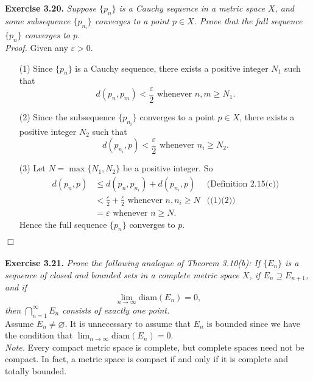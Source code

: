 \documentclass{article}
\begin{document}
\textbf{Exercise 3.20.}
\emph{Suppose $\{p_n\}$ is a Cauchy sequence in a metric space $X$,
and some subsequence $\{p_{n_i}\}$ converges to a point $p \in X$.
Prove that the full sequence $\{p_n\}$ converges to $p$. } \\

\emph{Proof.}
Given any $\varepsilon > 0$.
\begin{enumerate}
\item[(1)]
Since $\{p_n\}$ is a Cauchy sequence, there exists a positive integer $N_1$ such that
$$d(p_n,p_m) < \frac{\varepsilon}{2} \text{ whenever } n, m \geq N_1.$$
\item[(2)]
Since the subsequence $\{p_{n_i}\}$ converges to a point $p \in X$,
there exists a positive integer $N_2$ such that
$$d(p_{n_i},p) < \frac{\varepsilon}{2} \text{ whenever } n_i \geq N_2.$$
\item[(3)]
Let $N = \max\{N_1, N_2\}$ be a positive integer.
So
\begin{align*}
d(p_n,p)
&\leq d(p_n,p_{n_i}) + d(p_{n_i}, p)
  &\text{(Definition 2.15(c))} \\
&< \frac{\varepsilon}{2} + \frac{\varepsilon}{2} \text{ whenever } n, n_i \geq N
  &\text{((1)(2))} \\
&= \varepsilon \text{ whenever } n \geq N.
\end{align*}
Hence the full sequence $\{p_n\}$ converges to $p$.
\end{enumerate}
$\Box$ \\\\






\textbf{Exercise 3.21.}
\emph{Prove the following analogue of Theorem 3.10(b):
If $\{E_n\}$ is a sequence of closed and bounded sets in a complete metric space $X$,
if $E_n \supseteq E_{n+1}$, and if
$$\lim_{n \to \infty} \mathrm{diam}(E_n) = 0,$$
then $\bigcap_{n=1}^{\infty} E_n$ consists of exactly one point.} \\

Assume $E_n \neq \varnothing$. It is unnecessary to assume that $E_n$ is bounded
since we have the condition that $\lim_{n \to \infty} \mathrm{diam}(E_n) = 0$.\\

\emph{Note.}
Every compact metric space is complete, but complete spaces need not be compact.
In fact, a metric space is compact if and only if it is complete and totally bounded. \\
\end{document}
